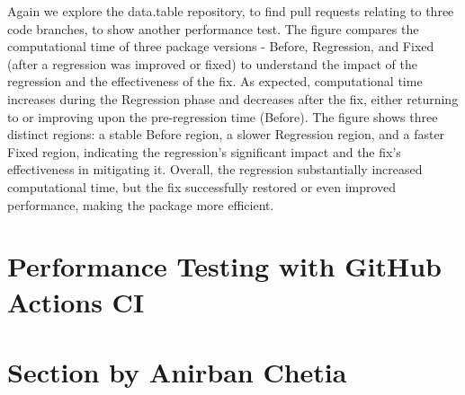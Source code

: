 \noindent Again we explore the data.table repository, to find pull requests relating to three code branches, to show another performance test. The figure compares the computational time of three package versions - Before, Regression, and Fixed (after a regression was improved or fixed) to understand the impact of the regression and the effectiveness of the fix. As expected, computational time increases during the Regression phase and decreases after the fix, either returning to or improving upon the pre-regression time (Before). The figure shows three distinct regions: a stable Before region, a slower Regression region, and a faster Fixed region, indicating the regression's significant impact and the fix's effectiveness in mitigating it. Overall, the regression substantially increased computational time, but the fix successfully restored or even improved performance, making the package more efficient.\\


\section{Performance Testing with GitHub Actions CI}
\section{Section by Anirban Chetia}

